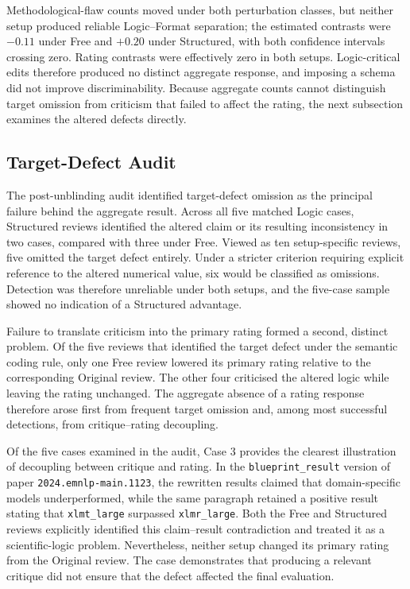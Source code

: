 Methodological-flaw counts moved under both perturbation classes, but neither setup produced reliable Logic--Format separation; the estimated contrasts were $-0.11$ under Free and $+0.20$ under Structured, with both confidence intervals crossing zero. Rating contrasts were effectively zero in both setups. Logic-critical edits therefore produced no distinct aggregate response, and imposing a schema did not improve discriminability. Because aggregate counts cannot distinguish target omission from criticism that failed to affect the rating, the next subsection examines the altered defects directly.

\subsection{Target-Defect Audit}
\label{sec:rq2-audit}

The post-unblinding audit identified target-defect omission as the principal failure behind the aggregate result. Across all five matched Logic cases, Structured reviews identified the altered claim or its resulting inconsistency in two cases, compared with three under Free. Viewed as ten setup-specific reviews, five omitted the target defect entirely. Under a stricter criterion requiring explicit reference to the altered numerical value, six would be classified as omissions. Detection was therefore unreliable under both setups, and the five-case sample showed no indication of a Structured advantage.

Failure to translate criticism into the primary rating formed a second, distinct problem. Of the five reviews that identified the target defect under the semantic coding rule, only one Free review lowered its primary rating relative to the corresponding Original review. The other four criticised the altered logic while leaving the rating unchanged. The aggregate absence of a rating response therefore arose first from frequent target omission and, among most successful detections, from critique--rating decoupling.

Of the five cases examined in the audit, Case 3 provides the clearest illustration of decoupling between critique and rating. In the \texttt{blueprint\_result} version of paper \texttt{2024.emnlp-main.1123}, the rewritten results claimed that domain-specific models underperformed, while the same paragraph retained a positive result stating that \texttt{xlmt\_large} surpassed \texttt{xlmr\_large}. Both the Free and Structured reviews explicitly identified this claim--result contradiction and treated it as a scientific-logic problem. Nevertheless, neither setup changed its primary rating from the Original review. The case demonstrates that producing a relevant critique did not ensure that the defect affected the final evaluation.

